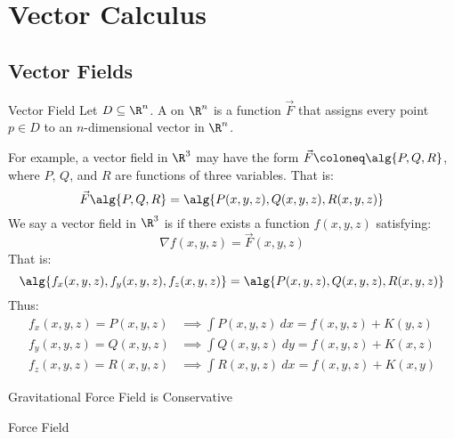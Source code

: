 \chapter{Vector Calculus}

\section{Vector Fields}

\begin{dfnbox}{Vector Field}{}
    Let $D \subseteq \R^n$. A  on $\R^n$ is a function $\vec{F}$ that assigns every point $p \in D$ to an $n$-dimensional vector in $\R^n$.
\end{dfnbox}

For example, a vector field in $\R^3$ may have the form $\vec{F} \coloneq \alg{P,Q,R}$, where $P$, $Q$, and $R$ are functions of three variables. That is:
\[ \vec{F} \alg{P, Q, R} = \alg{P(x,y,z), Q(x,y,z), R(x,y,z)} \]
We say a vector field in $\R^3$ is  if there exists a function $f(x,y,z)$ satisfying:
\[ \nabla f(x,y,z) = \vec{F}(x,y,z) \]
That is:
\[ \alg{ f_x (x,y,z), f_y(x,y,z), f_z(x,y,z) } = \alg{ P(x,y,z), Q(x,y,z), R(x,y,z)} \]
Thus:
\begin{align*}
    f_x (x,y,z) = P(x,y,z) &\implies \int P(x,y,z)\ dx = f(x,y,z) + K(y,z) \\
    f_y (x,y,z) = Q(x,y,z) &\implies \int Q(x,y,z)\ dy = f(x,y,z) + K(x,z) \\
    f_z (x,y,z) = R(x,y,z) &\implies \int R(x,y,z)\ dx = f(x,y,z) + K(x,y)
\end{align*}

\begin{exbox}{Gravitational Force Field is Conservative}{}
    
\end{exbox}

\begin{dfnbox}{Force Field}{}
    
\end{dfnbox}
